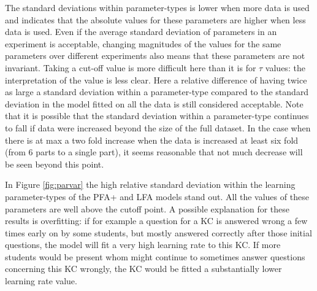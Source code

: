 \documentclass{scrartcl}
\begin{document}
The standard deviations within parameter-types is lower when more data is used and indicates that the absolute values for these parameters are higher when less data is used. Even if the average standard deviation of parameters in an experiment is acceptable, changing magnitudes of the values for the same parameters over different experiments also means that these parameters are not invariant. Taking a cut-off value is more difficult here than it is for $\tau$ values: the interpretation of the value is less clear. Here a relative difference of having twice as large a standard deviation within a parameter-type compared to the standard deviation in the model fitted on all the data is still considered acceptable. Note that it is possible that the standard deviation within a parameter-type continues to fall if data were increased beyond the size of the full dataset. In the case when there is at max a two fold increase when the data is increased at least six fold (from 6 parts to a single part), it seems reasonable that not much decrease will be seen beyond this point.

In Figure \ref{fig:parvar} the high relative standard deviation within the learning parameter-types of the PFA+ and LFA models stand out. All the values of these parameters are well above the cutoff point. A possible explanation for these results is overfitting: if for example a question for a KC is answered wrong a few times early on by some students, but mostly answered correctly after those initial questions, the model will fit a very high learning rate to this KC. If more students would be present whom might continue to sometimes answer questions concerning this KC wrongly, the KC would be fitted a substantially lower learning rate value.
\end{document}
